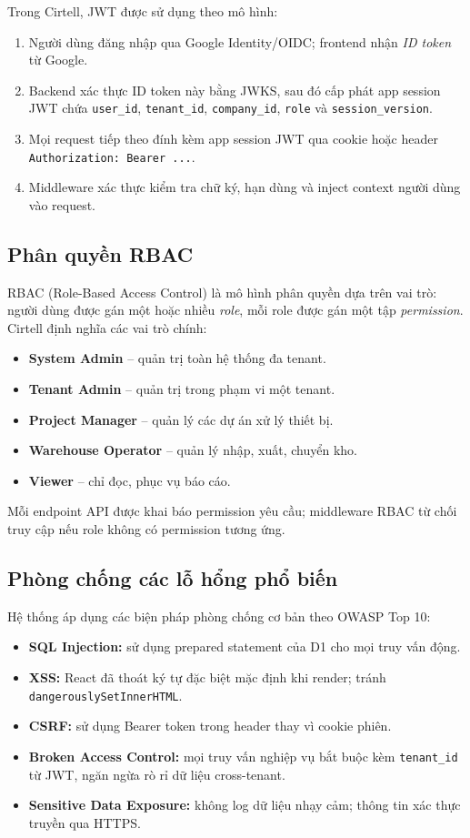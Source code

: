 Trong Cirtell, JWT được sử dụng theo mô hình:
\begin{enumerate}[leftmargin=1.2cm]
    \item Người dùng đăng nhập qua Google Identity/OIDC; frontend nhận \emph{ID token} từ Google.
    \item Backend xác thực ID token này bằng JWKS, sau đó cấp phát app session JWT chứa \texttt{user\_id}, \texttt{tenant\_id}, \texttt{company\_id}, \texttt{role} và \texttt{session\_version}.
    \item Mọi request tiếp theo đính kèm app session JWT qua cookie hoặc header \texttt{Authorization: Bearer ...}.
    \item Middleware xác thực kiểm tra chữ ký, hạn dùng và inject context người dùng vào request.
\end{enumerate}

\subsection{Phân quyền RBAC}
RBAC (Role-Based Access Control) \cite{sandhu1996rbac} là mô hình phân quyền dựa trên vai trò: người dùng được gán một hoặc nhiều \emph{role}, mỗi role được gán một tập \emph{permission}. Cirtell định nghĩa các vai trò chính:

\begin{itemize}[leftmargin=1.2cm]
    \item \textbf{System Admin} -- quản trị toàn hệ thống đa tenant.
    \item \textbf{Tenant Admin} -- quản trị trong phạm vi một tenant.
    \item \textbf{Project Manager} -- quản lý các dự án xử lý thiết bị.
    \item \textbf{Warehouse Operator} -- quản lý nhập, xuất, chuyển kho.
    \item \textbf{Viewer} -- chỉ đọc, phục vụ báo cáo.
\end{itemize}

Mỗi endpoint API được khai báo permission yêu cầu; middleware RBAC từ chối truy cập nếu role không có permission tương ứng.

\subsection{Phòng chống các lỗ hổng phổ biến}
Hệ thống áp dụng các biện pháp phòng chống cơ bản theo OWASP Top 10:
\begin{itemize}[leftmargin=1.2cm]
    \item \textbf{SQL Injection:} sử dụng prepared statement của D1 cho mọi truy vấn động.
    \item \textbf{XSS:} React đã thoát ký tự đặc biệt mặc định khi render; tránh \texttt{dangerouslySetInnerHTML}.
    \item \textbf{CSRF:} sử dụng Bearer token trong header thay vì cookie phiên.
    \item \textbf{Broken Access Control:} mọi truy vấn nghiệp vụ bắt buộc kèm \texttt{tenant\_id} từ JWT, ngăn ngừa rò rỉ dữ liệu cross-tenant.
    \item \textbf{Sensitive Data Exposure:} không log dữ liệu nhạy cảm; thông tin xác thực truyền qua HTTPS.
\end{itemize}

